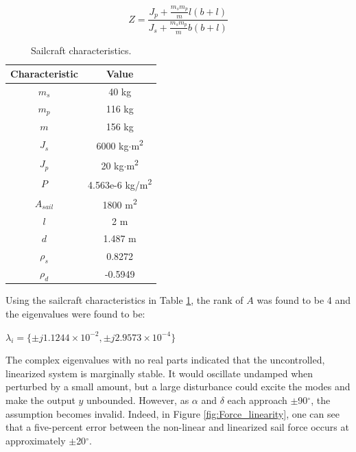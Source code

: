 \documentclass[]{aiaa-tc}%
\begin{document}
\begin{equation}
Z=\frac{J_p + \frac{m_sm_p}{m}l(b+l)}{J_s + \frac{m_sm_p}{m}b(b+l)}
\end{equation}
	
	\begin{table}[H]%
		\begin{center}
			\caption{Sailcraft characteristics\cite{WieSolarSail2}.}
			\label{t:Primary_variables}
			\begin{tabular}{|c|c|}
\hline 
Characteristic & Value  \\ \hline
$m_s$         &     40 kg\\
$m_p$         &      116 kg \\
$m$         &     156 kg \\
$J_s$   &     6000 kg$\cdot$m\textsuperscript{2} \\
$J_p$   &     20 kg$\cdot$m\textsuperscript{2} \\
$P$   &      4.563e-6 kg/m\textsuperscript{2}\\
$A_{sail}$       &     1800 m\textsuperscript{2} \\
$l$       &   2 m \\
$d$       &     1.487 m \\
$\rho_s$ &     0.8272 \\
$\rho_d$ &     -0.5949 \\
\hline
			\end{tabular}
		\end{center}
	\end{table}  

	Using the sailcraft characteristics in Table \ref{t:Primary_variables}, the rank of $A$ was found to be 4 and the eigenvalues were found to be:
	
	\vspace{5 mm}
{\centering
 $\lambda_i = \{\pm j1.1244\times10^{-2}, \pm j2.9573\times10^{-4}\}$\par
}
	
	\vspace{5 mm}

	The complex eigenvalues with no real parts indicated that the uncontrolled, linearized system is marginally stable. It would oscillate undamped when perturbed by a small amount, but a large disturbance could excite the modes and make the output $y$ unbounded. However, as $\alpha$ and $\delta$ each approach $\pm$90$^{\circ}$, the assumption becomes invalid. Indeed, in Figure \ref{fig:Force_linearity}, one can see that a five-percent error between the non-linear and linearized sail force occurs at approximately $\pm$20$^{\circ}$.
\end{document}
